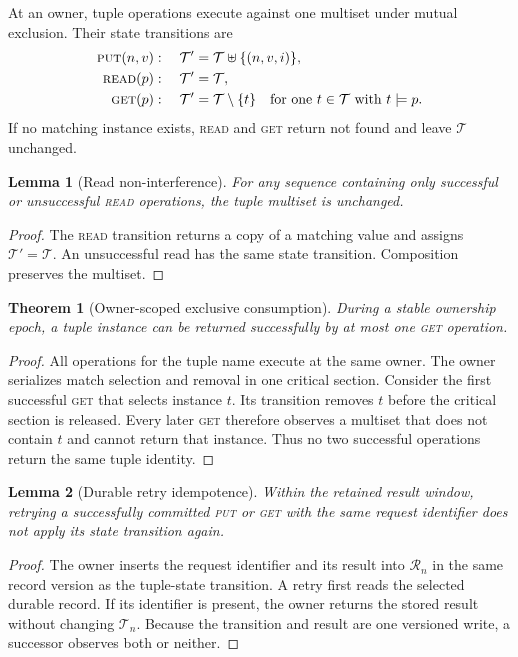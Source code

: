 \documentclass[conference]{IEEEtran}
\newcommand{\putop}{\textsc{put}\xspace}
\newcommand{\readop}{\textsc{read}\xspace}
\newcommand{\getop}{\textsc{get}\xspace}
\newtheorem{lemma}{Lemma}
\newtheorem{theorem}{Theorem}
\begin{document}
At an owner, tuple operations execute against one multiset under mutual
exclusion. Their state transitions are
\[
\begin{aligned}
\putop(n,v)&:\quad \mathcal{T}'=\mathcal{T}\uplus\{(n,v,i)\},\\
\readop(p)&:\quad \mathcal{T}'=\mathcal{T},\\
\getop(p)&:\quad
  \mathcal{T}'=\mathcal{T}\setminus\{t\}
  \quad\text{for one }t\in\mathcal{T}\text{ with }t\models p.
\end{aligned}
\]
If no matching instance exists, \readop and \getop return not found and leave
$\mathcal{T}$ unchanged.

\begin{lemma}[Read non-interference]
For any sequence containing only successful or unsuccessful \readop
operations, the tuple multiset is unchanged.
\end{lemma}
\begin{proof}
The \readop transition returns a copy of a matching value and assigns
$\mathcal{T}'=\mathcal{T}$. An unsuccessful read has the same state
transition. Composition preserves the multiset.
\end{proof}

\begin{theorem}[Owner-scoped exclusive consumption]
\label{thm:exclusive}
During a stable ownership epoch, a tuple instance can be returned successfully
by at most one \getop operation.
\end{theorem}
\begin{proof}
All operations for the tuple name execute at the same owner. The owner
serializes match selection and removal in one critical section. Consider the
first successful \getop that selects instance $t$. Its transition removes $t$
before the critical section is released. Every later \getop therefore observes
a multiset that does not contain $t$ and cannot return that instance. Thus no
two successful operations return the same tuple identity.
\end{proof}

\begin{lemma}[Durable retry idempotence]
\label{lem:retry}
Within the retained result window, retrying a successfully committed
\putop or \getop with the same request identifier does not apply its state
transition again.
\end{lemma}
\begin{proof}
The owner inserts the request identifier and its result into
$\mathcal{R}_n$ in the same record version as the tuple-state transition. A
retry first reads the selected durable record. If its identifier is present,
the owner returns the stored result without changing $\mathcal{T}_n$. Because
the transition and result are one versioned write, a successor observes both
or neither.
\end{proof}
\end{document}
